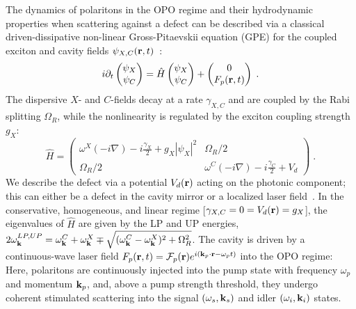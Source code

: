The dynamics of polaritons in the OPO regime and their hydrodynamic
properties when scattering against a defect can be described via a
classical driven-dissipative non-linear Gross-Pitaevskii equation
(GPE) for the coupled exciton and cavity fields $\psi_{X,C}
(\mathbf{r},t)$~\cite{Whittaker_2005,Carusotto_2013}:
%
\begin{equation}
  i\partial_t \begin{pmatrix} \psi_X \\ \psi_C \end{pmatrix} =
  \hat{H} \begin{pmatrix} \psi_X \\ \psi_C \end{pmatrix}
  + \begin{pmatrix} 0 \\ F_p(\mathbf{r},t) \end{pmatrix} \; .
\label{eq:gpequ}
\end{equation}
%
The dispersive $X$- and $C$-fields decay at a rate $\gamma_{X,C}$ and
are coupled by the Rabi splitting $\Omega_R$, while the nonlinearity
is regulated by the exciton coupling strength $g_X$:
%
\begin{equation}
  \hat{H} = \begin{pmatrix} \omega^{X}(-i\nabla) - i
    \frac{\gamma_X}{2} + g_X |\psi_X|^2 & \Omega_R/2 \\ \Omega_R/2 &
    \omega^C(-i\nabla) - i \frac{\gamma_C}{2} + V_d \end{pmatrix} \;
  .
\end{equation}
%
We describe the defect via a potential $V_d (\mathbf{r})$ acting on the
photonic component; this can either be a defect in the cavity mirror
or a localized laser field~\cite{Amo_2009,Amo_2010,Zajac_2012}.
%
In the conservative, homogeneous, and linear regime [$\gamma_{X,C}=0=
V_d (\mathbf{r})= g_X$], the eigenvalues of $\hat{H}$ are given by the
LP and UP energies, $2
\omega_{\mathbf{k}}^{LP,UP} = \omega_{\mathbf{k}}^{C} +
\omega_{\mathbf{k}}^{X} \mp \sqrt{(\omega_{\mathbf{k}}^{C} -
  \omega_{\mathbf{k}}^{X})^2 + \Omega_R^2}$.
%
The cavity is driven by a continuous-wave laser field $F_p(\mathbf{r},t)
= \mathcal{F}_p(\mathbf{r}) e^{i (\mathbf{k}_p \cdot \mathbf{r} - \omega_p
  t)}$ into the OPO regime: Here, polaritons are continuously injected
into the pump state with frequency $\omega_p$ and momentum
$\mathbf{k}_p$, and, above a pump strength threshold, they undergo coherent
stimulated scattering into the signal $(\omega_s, \mathbf{k}_s)$ and
idler $(\omega_i, \mathbf{k}_i)$ states. 

